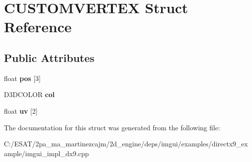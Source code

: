 \hypertarget{struct_c_u_s_t_o_m_v_e_r_t_e_x}{}\section{C\+U\+S\+T\+O\+M\+V\+E\+R\+T\+EX Struct Reference}
\label{struct_c_u_s_t_o_m_v_e_r_t_e_x}
\subsection*{Public Attributes}
\begin{DoxyCompactItemize}
\item 
\mbox{\label{struct_c_u_s_t_o_m_v_e_r_t_e_x_acbccf678628bfc243d77a99c1d7c7af3}} 
float {\bfseries pos} \mbox{[}3\mbox{]}
\item 
\mbox{\label{struct_c_u_s_t_o_m_v_e_r_t_e_x_a89194164a47349e936f21e10bb29f26a}} 
D3\+D\+C\+O\+L\+OR {\bfseries col}
\item 
\mbox{\label{struct_c_u_s_t_o_m_v_e_r_t_e_x_a2c27e901db37bc828fb408010596304c}} 
float {\bfseries uv} \mbox{[}2\mbox{]}
\end{DoxyCompactItemize}


The documentation for this struct was generated from the following file\+:\begin{DoxyCompactItemize}
\item 
C\+:/\+E\+S\+A\+T/2pa\+\_\+ma\+\_\+martinezcajm/2d\+\_\+engine/deps/imgui/examples/directx9\+\_\+example/imgui\+\_\+impl\+\_\+dx9.\+cpp\end{DoxyCompactItemize}

